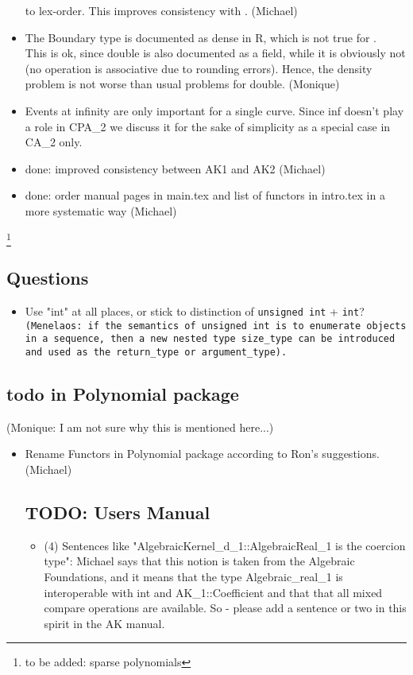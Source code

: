 \begin{itemize}
to lex-order. This improves consistency with . 
(Michael)
\item
The Boundary type is documented as dense in R, which is not true
for .\\ 
This is ok, since double is also documented as a
field, while it is obviously not (no operation is associative
due to rounding errors). Hence, the density problem is not worse
than usual problems for double. (Monique)
\item 
Events at infinity are only important for a single curve. Since
inf doesn't play a role in CPA\_2 we discuss it for the sake of
simplicity as a special case in CA\_2 only. 
\item {} done: improved consistency between AK1 and AK2 (Michael)
\item {} done: order manual pages in main.tex and list of functors 
in intro.tex in a more systematic way (Michael)
\end{itemize}
\footnote{to be added: sparse polynomials}

\subsection{Questions}
\begin{itemize}
\item Use "int" at all places, or stick to distinction of \texttt{unsigned
   int} + \texttt{int}?\\
   \texttt{(Menelaos: if the semantics of \texttt{unsigned int} is to enumerate
   objects in a sequence, then a new nested type \texttt{size\_type}
   can be introduced and used as the \texttt{return\_type} or
   \texttt{argument\_type}).}
\end{itemize}

\subsection{todo in Polynomial package} 
(Monique: I am not sure why this is mentioned here...)
\begin{itemize}
\item 
Rename Functors in Polynomial package according to Ron's 
suggestions. (Michael)

\subsection{TODO: Users Manual}

\begin{itemize}
\item (4) Sentences like "AlgebraicKernel\_d\_1::AlgebraicReal\_1 is the
coercion type":
Michael says that this notion is taken from the Algebraic Foundations, and it
means that the type Algebraic\_real\_1 is interoperable with int and
AK\_1::Coefficient and that that all mixed compare operations are available.
So - please add a sentence or two in this spirit in the AK manual.
\end{itemize}

\end{itemize} 

